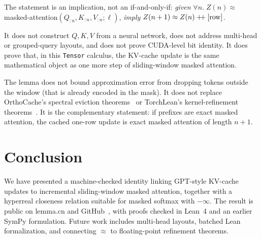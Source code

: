 \documentclass[11pt,a4paper]{article}
\newcommand{\rowop}{\operatorname{row}}
\newcommand{\concat}{\mathbin{+\mkern-4mu+}}
\newcommand{\XEq}{\approx}
\begin{document}
The statement is an implication, not an if-and-only-if:
\emph{given} $\forall n.\; Z(n)\XEq$ masked-attention$(Q_{:n},K_{:n},V_{:n};\ell)$,
\emph{imply} $Z(n+1)\XEq Z(n)\concat[\rowop]$.

It does not construct $Q,K,V$ from a neural network, does not address multi-head or grouped-query layouts, and does not prove CUDA-level bit identity.
It does prove that, in this \texttt{Tensor} calculus, the KV-cache update is the same mathematical object as one more step of sliding-window masked attention.

The lemma does not bound approximation error from dropping tokens outside the window (that is already encoded in the mask).
It does not replace OrthoCache's spectral eviction theorems~\cite{orthocache} or TorchLean's kernel-refinement theorems~\cite{torchlean}.
It is the complementary statement: if prefixes are exact masked attention, the cached one-row update is exact masked attention of length $n+1$.

\section{Conclusion}
\label{sec:conclusion}

We have presented a machine-checked identity linking GPT-style KV-cache updates to incremental sliding-window masked attention, together with a hyperreal closeness relation suitable for masked softmax with $-\infty$.
The result is public on lemma.cn and GitHub~\cite{lemma_repo}, with proofs checked in Lean~4 and an earlier SymPy formulation.
Future work includes multi-head layouts, batched Lean formalization, and connecting $\XEq$ to floating-point refinement theorems.



\end{document}
